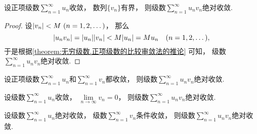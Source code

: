 \begin{proposition}
设正项级数\(\sum\limits_{n=1}^\infty u_n\)收敛，
数列\(\{v_n\}\)有界，
则级数\(\sum\limits_{n=1}^\infty u_n v_n\)绝对收敛.
\begin{proof}
设\(\abs{v_n} < M\ (n=1,2,\dotsc)\)，
那么\[
	\abs{u_n v_n}
	= \abs{u_n} \abs{v_n}
	< M \abs{u_n}
	= M u_n
	\quad(n=1,2,\dotsc),
\]
于是根据\cref{theorem:无穷级数.正项级数的比较审敛法的推论} 可知，
级数\(\sum\limits_{n=1}^\infty u_n v_n\)绝对收敛.
\end{proof}
\end{proposition}

\begin{proposition}
设正项级数\(\sum\limits_{n=1}^\infty u_n\)和\(\sum\limits_{n=1}^\infty v_n\)都收敛，
则级数\(\sum\limits_{n=1}^\infty u_n v_n\)绝对收敛.
\end{proposition}

\begin{proposition}
设级数\(\sum\limits_{n=1}^\infty u_n\)收敛，
\(\lim\limits_{n\to\infty} v_n = 0\)，
则级数\(\sum\limits_{n=1}^\infty u_n v_n\)绝对收敛.
\end{proposition}

\begin{proposition}
设级数\(\sum\limits_{n=1}^\infty u_n\)绝对收敛，
级数\(\sum\limits_{n=1}^\infty v_n\)条件收敛，
则级数\(\sum\limits_{n=1}^\infty u_n v_n\)绝对收敛.
\end{proposition}
